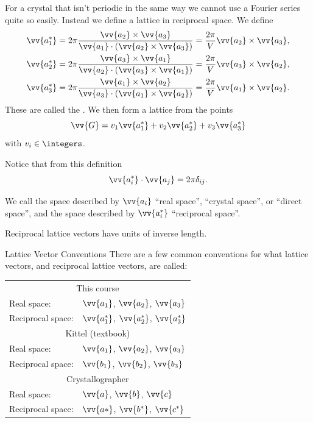 \documentclass[fleqn]{NotesClass}
\begin{document}
    For a crystal that isn't periodic in the same way we cannot use a Fourier series quite so easily.
    Instead we define a lattice in reciprocal space.
    We define
    \begin{align}
        \vv{a_1^*} &= 2\pi \frac{\vv{a_2}\times\vv{a_3}}{\vv{a_1}\cdot(\vv{a_2}\times\vv{a_3})} = \frac{2\pi}{V} \vv{a_2}\times\vv{a_3},\\
        \vv{a_2^*} &= 2\pi \frac{\vv{a_3}\times\vv{a_1}}{\vv{a_2}\cdot(\vv{a_3}\times\vv{a_1})} = \frac{2\pi}{V} \vv{a_3}\times\vv{a_2},\\
        \vv{a_3^*} &= 2\pi \frac{\vv{a_1}\times\vv{a_2}}{\vv{a_3}\cdot(\vv{a_1}\times\vv{a_2})} = \frac{2\pi}{V} \vv{a_1}\times\vv{a_2}.
    \end{align}
    These are called the .
    We then form a lattice from the points
    \begin{equation}
        \vv{G} = v_1\vv{a_1^*} + v_2\vv{a_2^*} + v_3\vv{a_3^*}
    \end{equation}
    with \(v_i \in \integers\).
    
    Notice that from this definition
    \begin{equation}
        \vv{a_i^*} \cdot \vv{a_j} = 2\pi \delta_{ij}.
    \end{equation}
    
    We call the space described by \(\vv{a_i}\) \enquote{real space}, \enquote{crystal space}, or \enquote{direct space}, and the space described by \(\vv{a_i^*}\) \enquote{reciprocal space}.
    
    Reciprocal lattice vectors have units of inverse length.
    
    \begin{ntn}{Lattice Vector Conventions}{}
        There are a few common conventions for what lattice vectors, and reciprocal lattice vectors, are called:
        \begin{tabular}{ll}\toprule
            \multicolumn{2}{c}{This course}\\
            Real space: & \(\vv{a_1}\), \(\vv{a_2}\), \(\vv{a_3}\)\\
            Reciprocal space: & \(\vv{a_1^*}\), \(\vv{a_2^*}\), \(\vv{a_3^*}\)\\\midrule
            \multicolumn{2}{c}{Kittel (textbook)}\\
            Real space: & \(\vv{a_1}\), \(\vv{a_2}\), \(\vv{a_3}\)\\
            Reciprocal space: & \(\vv{b_1}\), \(\vv{b_2}\), \(\vv{b_3}\)\\\midrule
            \multicolumn{2}{c}{Crystallographer}\\
            Real space: & \(\vv{a}\), \(\vv{b}\), \(\vv{c}\)\\
            Reciprocal space: & \(\vv{a*}\), \(\vv{b^*}\), \(\vv{c^*}\)\\\bottomrule
        \end{tabular}
    \end{ntn}
\end{document}
